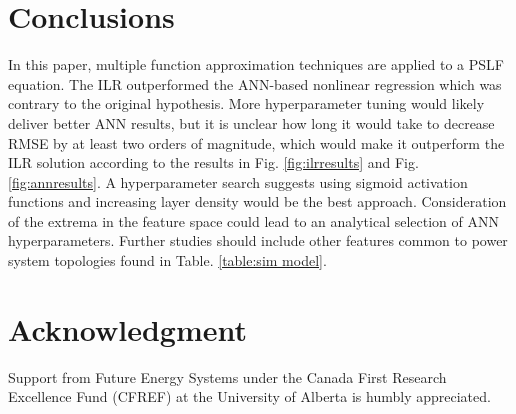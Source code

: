 \documentclass[conference]{IEEEtran}
\begin{document}
\section{Conclusions}
\label{sec:conc}
In this paper, multiple function approximation techniques are applied to a PSLF equation. The ILR outperformed the ANN-based nonlinear regression which was contrary to the original hypothesis. More hyperparameter tuning would likely deliver better ANN results, but it is unclear how long it would take to decrease RMSE by at least two orders of magnitude, which would make it outperform the ILR solution according to the results in Fig. \ref{fig:ilrresults} and Fig. \ref{fig:annresults}. A hyperparameter search suggests using sigmoid activation functions and increasing layer density would be the best approach. Consideration of the extrema in the feature space could lead to an analytical selection of ANN hyperparameters. Further studies should include other features common to power system topologies found in Table. \ref{table:sim model}.

\section*{Acknowledgment}
Support from Future Energy Systems under the Canada First Research Excellence Fund (CFREF) at the University of Alberta is humbly appreciated.




\end{document}
